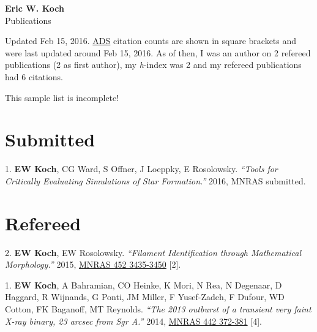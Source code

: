 \documentclass[letterpaper,11pt]{article}
\newcommand{\myname}{Eric W. Koch}
\newcommand{\mysite}{e-koch.github.io}
\newenvironment{publist}{
  \begingroup
  \raggedright
  \begin{description}[leftmargin=4ex,style=sameline]
}{
  \end{description}
  \endgroup
}
\begin{document}
\pagestyle{fancy}
\lhead{} \chead{} \rhead{} \renewcommand{\headrule}{\relax}
\cfoot{\thepage/\pageref*{LastPage}}
\rfoot{\textsc{\myname}}

\begin{center}
\textbf{\Large \myname} \\
{\large Publications}
\end{center}



\noindent Updated %
Feb 15, 2016.
\href{http://labs.adsabs.harvard.edu/adsabs}{ADS} citation counts are shown in square brackets and were last updated around
Feb 15, 2016. As of then, I was an author on 2 refereed
publications (2 as first author), my \textit{h}-index was 2 and
my refereed publications had 6 citations.


This sample list is incomplete!



\section*{Submitted}

\begin{publist}
\item[1.] \textbf{EW Koch}, CG Ward, S Offner, J Loeppky, E Rosolowsky. \textit{``Tools for Critically Evaluating Simulations of Star Formation.''} 2016, MNRAS submitted.
\end{publist}

\section*{Refereed}

\begin{publist}
\item[2.] \textbf{EW Koch}, EW Rosolowsky. \textit{``Filament Identification through Mathematical Morphology.''} 2015, \href{http://adsabs.harvard.edu/abs/2015MNRAS.452.3435K}{MNRAS 452 3435-3450} [2].
\item[1.] \textbf{EW Koch}, A Bahramian, CO Heinke, K Mori, N Rea, N Degenaar, D Haggard, R Wijnands, G Ponti, JM Miller, F Yusef-Zadeh, F Dufour, WD Cotton, FK Baganoff, MT Reynolds. \textit{``The 2013 outburst of a transient very faint X-ray binary, 23 arcsec from Sgr A\textasteriskcentered.''} 2014, \href{http://adsabs.harvard.edu/abs/2014MNRAS.442..372K}{MNRAS 442 372-381} [4].
\end{publist}


\end{document}
